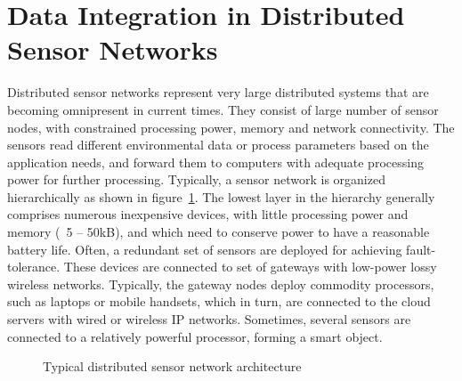 \section{Data Integration in Distributed Sensor Networks}

Distributed sensor networks represent  very large distributed systems that are becoming omnipresent in current times. They
consist of large number of sensor nodes, with constrained processing power, memory and network connectivity. The sensors
read different environmental data or process parameters based on the application needs, and forward them to computers with 
adequate processing power for further processing. 
%
Typically, a sensor network is organized hierarchically as shown in figure~\ref{fig:knowledge:iot}. The lowest layer in the 
hierarchy generally comprises numerous inexpensive devices, with little processing power and memory (~5 -- 50kB), and which 
need to conserve power to have a reasonable battery life. Often, a redundant set of sensors are deployed for achieving
fault-tolerance. These devices are connected to set of gateways with low-power lossy wireless networks. Typically, the gateway 
nodes deploy commodity processors, such as laptops or mobile handsets, which in turn, are connected to the cloud servers with 
wired or wireless IP networks.  Sometimes, several sensors are connected to a relatively powerful processor, forming a smart 
object. 

\begin{figure}[!htbp]
	\centerline{
	}
	\caption{Typical distributed sensor network architecture}
	\label{fig:knowledge:iot}
\end{figure}


